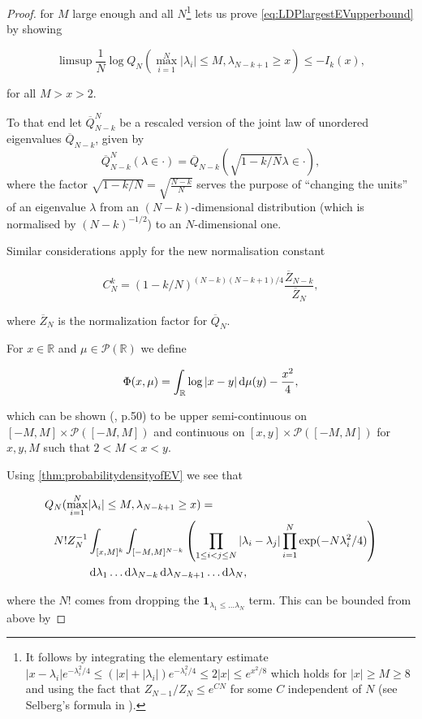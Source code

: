 \begin{proof}
	for $M$ large enough and all $N$\footnote{It follows by integrating the elementary estimate $|x-\lambda_i|e^{-\lambda_i^2/4}\leq (|x|+|\lambda_i|)e^{-\lambda_i^2/4}\leq 2|x|\leq e^{x^2/8}$ which holds for $|x|\geq M \geq 8$ and using the fact that $Z_{N-1}/Z_N\leq e^{CN}$ for some $C$ independent of $N$ (see Selberg's formula in \cite{Mehta2004random}).} lets us prove \ref{eq:LDPlargestEVupperbound} by showing
	
	$$\limsup\frac{1}{N}\log Q_N(\max_{i=1}^N|\lambda_i|\leq M, \lambda_{N-k+1}\geq x)\leq-I_k(x),$$
	
	for all $M>x>2$.
	
	To that end let $\overline Q_{N-k}^N$ be a rescaled version of the joint law of unordered eigenvalues $\overline Q_{N-k}$, given by 
	$$\overline Q_{N-k}^N(\lambda\in\cdot) = \overline Q_{N-k}(\sqrt{1-k/N}\lambda\in\cdot),$$ where the factor $\sqrt{1-k/N}=\sqrt{\frac{N-k}{N}}$ serves the purpose of ``changing the units'' of an eigenvalue $\lambda$ from an $(N-k)$-dimensional distribution (which is normalised by $(N-k)^{-1/2}$) to an $N$-dimensional one.
	
	Similar considerations apply for the new normalisation constant 
	
	$$C_N^k = (1-k/N)^{(N-k)(N-k+1)/4}\frac{\overline Z_{N-k}}{\overline Z_N},$$
	
	where $\overline Z_N$ is the normalization factor for $\overline Q_N$.
	
	For $x\in\mathbb R$ and $\mu\in\mathcal P(\mathbb R)$ we define
	
	$$\Phi(x,\mu)=\int_\mathbb{R}\log|x-y|\mathop{}\!\mathrm{d}\mu(y)-\frac{x^2}{4},$$
	
	which can be shown (\cite{ArousAging}, p.50) to be upper semi-continuous on $[-M,M]\times\mathcal P([-M,M])$ and continuous on $[x,y]\times\mathcal P([-M,M])$ for $x,y,M$ such that $2<M<x<y$.
	
	Using \ref{thm:probabilitydensityofEV} we see that
	
	\begin{align*}
		Q_N(\max_{i=1}^N&|\lambda_i|\leq M,\lambda_{N-k+1}\geq x)= \\ N! Z_N^{-1}&\int_{[x,M]^k}\int_{[-M,M]^{N-k}}\left(\prod_{1\leq i<j\leq N}|\lambda_i-\lambda_j|\prod_{i=1}^N \exp(-N\lambda_i^2/4)\right)\\
		&\mathop{}\!\mathrm{d}\lambda_1\dots\mathop{}\!\mathrm{d}\lambda_{N-k}\mathop{}\!\mathrm{d}\lambda_{N-k+1}\dots\mathop{}\!\mathrm{d}\lambda_N,
	\end{align*}
	
	where the $N!$ comes from dropping the $\mathbf 1_{\lambda_1\leq\dots\lambda_N}$ term. This can be bounded from above by
	

\end{proof}
